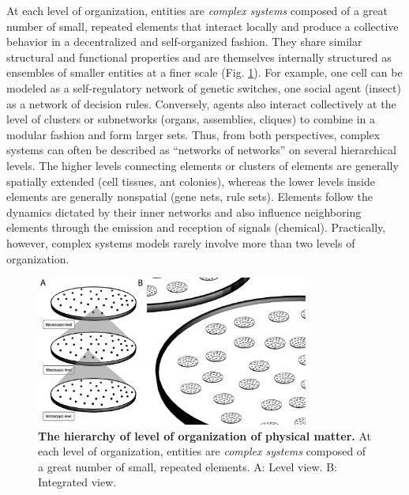   At each level of organization, entities are \textit{complex systems} composed of a great number of small, repeated elements that interact locally and produce a collective behavior in a decentralized and self-organized fashion. They share similar structural and functional properties and are themselves internally structured as ensembles of smaller entities at a finer scale (Fig. \ref{leveloforganization_micro_macro}). For example, one cell can be modeled as a self-regulatory network of genetic switches, one social agent (insect) as a network of decision rules. Conversely, agents also interact collectively at the level of clusters or subnetworks (organs, assemblies, cliques) to combine in a modular fashion and form larger sets. Thus, from both perspectives, complex systems can often be described as “networks of networks” on several hierarchical levels. The higher levels connecting elements or clusters of elements are generally spatially extended (cell tissues, ant colonies), whereas the lower levels inside elements are generally nonspatial (gene nets, rule sets). Elements follow the dynamics dictated by their inner networks and also influence neighboring elements through the emission and reception of signals (chemical). Practically, however, complex systems models rarely involve more than two levels of organization. 
\begin{figure}
\begin{center}
\includegraphics[width=0.8\textwidth]{../../images/levels_of_organization/micro_macro/micro_macro_julien.png}
\end{center}
\caption{\textbf{The hierarchy of level of organization of physical matter.} At each level of organization, entities are \textit{complex systems} composed of a great number of small, repeated elements. A: Level view. B: Integrated view.}
\label{leveloforganization_micro_macro}
\end{figure}

